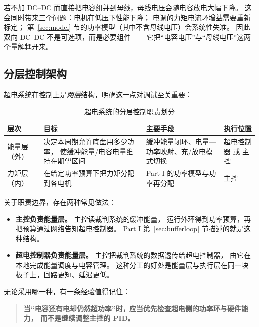 \documentclass[cn,blue,11pt,device=normal]{elegantnote}
\begin{document}
\begin{note}[为什么不能把电容直接并在母线上]
若不加 DC--DC 而直接把电容组并到母线，母线电压会随电容放电大幅下降。
这会同时带来三个问题：电机在低压下性能下降；
电调的力矩电流环增益需要重新标定；
第~\ref{sec:model} 节的功率模型（其中不含母线电压）会系统性失准。
因此双向 DC--DC 不是可选项，而是必要组件——
它把“电容电压”与“母线电压”这两个量解耦开来。
\end{note}

\subsection{分层控制架构}

超电系统在控制上是\emph{两层}结构，明确这一点对调试至关重要：

\begin{table}[htbp]
  \centering
  \small
  \caption{超电系统的分层控制职责划分}
  \label{tab:layers}
  \begin{tabular}{@{}>{\raggedright\arraybackslash}p{}>{\raggedright\arraybackslash}p{}>{\raggedright\arraybackslash}p{}>{\raggedright\arraybackslash}p{}@{}}
    \toprule
    层次 & 目标 & 主要手段 & 执行位置 \\
    \midrule
    能量层（外） & 决定本周期允许底盘用多少功率，
    使缓冲能量/电容电量维持在期望区间 &
    缓冲能量闭环、电量—功率映射、充/放电模式切换 &
    超电控制器 或 主控 \\
    \addlinespace[2pt]
    力矩层（内） & 在给定功率预算下把力矩分配到各电机 &
    Part I 的功率模型与功率再分配 &
    主控 \\
    \bottomrule
  \end{tabular}
\end{table}

关于职责边界，存在两种常见做法：
\begin{itemize}
  \item \textbf{主控负责能量层。} 主控读裁判系统的缓冲能量，
  运行外环得到功率预算，再把预算通过网络告知超电控制器。
  Part I 第~\ref{sec:bufferloop} 节描述的就是这种结构。
  \item \textbf{超电控制器负责能量层。} 主控把裁判系统的数据透传给超电控制器，
  由它在本地完成能量调度与电容管理。
  这种分工的好处是能量层与执行层在同一块板子上，回路更短、延迟更低。
\end{itemize}
无论采用哪一种，有一条经验值得记住：
\begin{quote}
\textbf{当“电容还有电却仍然超功率”时，应当优先检查超电侧的功率环与硬件能力，
而不是继续调整主控的 PID。}
\end{quote}
\end{document}
